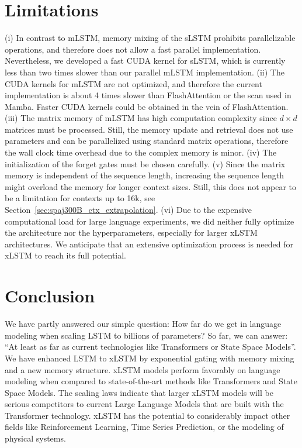 \section{Limitations}

(i) In contrast to mLSTM, memory mixing of the sLSTM prohibits parallelizable operations, and therefore does not allow a fast parallel implementation. Nevertheless, we developed a fast CUDA kernel for sLSTM, which is currently less than two times slower than our parallel mLSTM implementation. (ii) The CUDA kernels for mLSTM are not optimized, and therefore the current implementation is about 4 times slower than FlashAttention or the scan used in Mamba. Faster CUDA kernels could be obtained in the vein of FlashAttention. (iii) The matrix memory of mLSTM has high computation complexity since $d \times d$ matrices must be processed. Still, the memory update and retrieval does not use parameters and can be parallelized using standard matrix operations, therefore the wall clock time overhead due to the complex memory is minor. (iv) The initialization of the forget gates must be chosen carefully. (v) Since the matrix memory is independent of the sequence length, increasing the sequence length might overload the memory for longer context sizes. Still, this does not appear to be a limitation for contexts up to 16k, see Section~\ref{sec:spaj300B_ctx_extrapolation}.
(vi) Due to the expensive computational load for large language experiments, we did neither fully optimize the architecture nor the hyperparameters, especially for larger xLSTM architectures. We anticipate that an extensive optimization process is needed for xLSTM to reach its full potential.

\section{Conclusion}
We have partly answered our simple question: How far do we get in language modeling when scaling LSTM to billions of parameters? So far, we can answer: ``At least as far as current technologies like Transformers or State Space Models''. We have enhanced LSTM to xLSTM by exponential gating with memory mixing and a new memory structure. xLSTM models perform favorably on language modeling when compared to state-of-the-art methods like Transformers and State Space Models. The scaling laws indicate that larger xLSTM models will be serious competitors to current Large Language Models that are built with the Transformer technology. xLSTM has the potential to considerably impact other fields like Reinforcement Learning, Time Series Prediction, or the modeling of physical systems.


